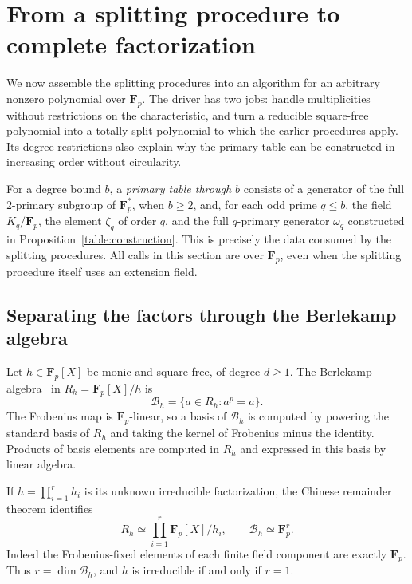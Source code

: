 \section{From a splitting procedure to complete factorization}
\label{driver:section}
\label{sec:driver}

We now assemble the splitting procedures into an algorithm for an arbitrary
nonzero polynomial over $\mathbf F_p$.  The driver has two jobs: handle
multiplicities without restrictions on the characteristic, and turn a
reducible square-free polynomial into a totally split polynomial to which
the earlier procedures apply.  Its degree restrictions also explain why the
primary table can be constructed in increasing order without circularity.

For a degree bound $b$, a \emph{primary table through $b$} consists of a
generator of the full $2$-primary subgroup of $\mathbf F_p^*$, when $b\ge2$,
and, for each odd prime $q\le b$, the field $K_q/\mathbf F_p$, the element
$\zeta_q$ of order $q$, and the full $q$-primary generator $\omega_q$
constructed in Proposition~\ref{table:construction}.  This is precisely the
data consumed by the splitting procedures.  All calls in this section are
over $\mathbf F_p$, even when the splitting procedure itself uses an
extension field.

\subsection{Separating the factors through the Berlekamp algebra}

Let $h\in\mathbf F_p[X]$ be monic and square-free, of degree $d\ge1$.
The Berlekamp algebra~\cite{Berlekamp67} in $R_h=\mathbf F_p[X]/h$ is
\begin{equation}
 \mathcal B_h=\{a\in R_h:a^p=a\}.
 \label{driver:berlekamp}
\end{equation}
The Frobenius map is $\mathbf F_p$-linear, so a basis of $\mathcal B_h$ is
computed by powering the standard basis of $R_h$ and taking the kernel of
Frobenius minus the identity.  Products of basis elements are computed in
$R_h$ and expressed in this basis by linear algebra.

If $h=\prod_{i=1}^{r}h_i$ is its unknown irreducible factorization, the
Chinese remainder theorem identifies
\[
 R_h\simeq\prod_{i=1}^{r}\mathbf F_p[X]/h_i,
 \qquad \mathcal B_h\simeq\mathbf F_p^r.
\]
Indeed the Frobenius-fixed elements of each finite field component are
exactly $\mathbf F_p$.  Thus $r=\dim\mathcal B_h$, and $h$ is irreducible
if and only if $r=1$.

